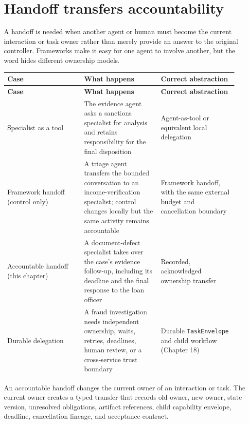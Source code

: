 \section{Handoff transfers accountability}

A handoff is needed when another agent or human must become the current interaction or task owner rather than merely provide an answer to the original controller. Frameworks make it easy for one agent to involve another, but the word hides different ownership models.\par

\BookTableStart
\small
\begin{longtable}{@{}Y{0.3133\linewidth}Y{0.3133\linewidth}Y{0.3133\linewidth}@{}}
\color{white}\bfseries \textbf{Case} & \color{white}\bfseries \textbf{What happens} & \color{white}\bfseries \textbf{Correct abstraction} \\
\endfirsthead
{}
\color{white}\bfseries \textbf{Case} & \color{white}\bfseries \textbf{What happens} & \color{white}\bfseries \textbf{Correct abstraction} \\
\endhead
Specialist as a tool & The evidence agent asks a sanctions specialist for analysis and retains responsibility for the final disposition & Agent-as-tool or equivalent local delegation \\
Framework handoff (control only) & A triage agent transfers the bounded conversation to an income-verification specialist; control changes locally but the same activity remains accountable & Framework handoff, with the same external budget and cancellation boundary \\
Accountable handoff (this chapter) & A document-defect specialist takes over the case's evidence follow-up, including its deadline and the final response to the loan officer & Recorded, acknowledged ownership transfer \\
Durable delegation & A fraud investigation needs independent ownership, waits, retries, deadlines, human review, or a cross-service trust boundary & Durable \lstinline[style=bookinline]!TaskEnvelope! and child workflow (Chapter 18) \\
\end{longtable}
\BookTableEnd

An accountable handoff changes the current owner of an interaction or task. The current owner creates a typed transfer that records old owner, new owner, state version, unresolved obligations, artifact references, child capability envelope, deadline, cancellation lineage, and acceptance contract.\par

